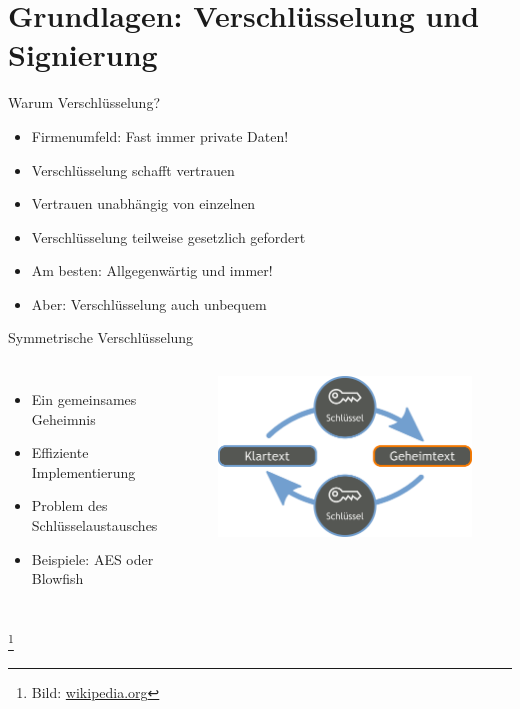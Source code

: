 \documentclass[10pt]{beamer}
\newcommand\blfootnote[1]{%
	\begingroup
	\renewcommand\thefootnote{}\footnote{#1}%
	\addtocounter{footnote}{-1}%
	\endgroup
}
\begin{document}
\section{Grundlagen: Verschlüsselung und Signierung}

%
%
\begin{frame}[fragile]{Warum Verschlüsselung?}
	\begin{itemize}
	\item Firmenumfeld: Fast immer private Daten!
	\item Verschlüsselung schafft vertrauen
	\item Vertrauen unabhängig von einzelnen
	\item Verschlüsselung teilweise gesetzlich gefordert
	\item Am besten: Allgegenwärtig und immer!
	\item Aber: Verschlüsselung auch unbequem
\end{itemize}
\end{frame}

%
%
\begin{frame}[fragile]{Symmetrische Verschlüsselung}
\begin{columns}[T,c,onlytextwidth]
	\begin{itemize}
		\item Ein gemeinsames Geheimnis
		\item Effiziente Implementierung
		\item Problem des Schlüsselaustausches
		\item Beispiele: AES oder Blowfish 
	\end{itemize}
	\begin{figure}
		\includegraphics[width=1\textwidth]{images/sym}
	\end{figure}
\end{columns}
\blfootnote{Bild: \href{https://de.wikipedia.org/wiki/Symmetrisches_Kryptosystem}{wikipedia.org}}
\end{frame}
\end{document}
